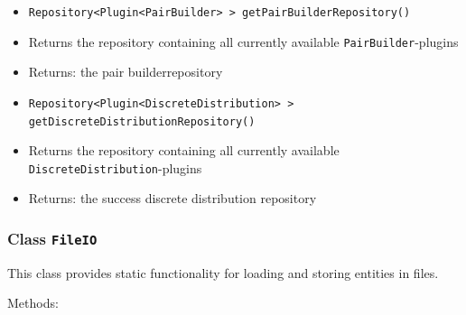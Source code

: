 \documentclass[parskip=full,11pt]{scrartcl}
\begin{document}
\begin{itemize}
	\item\texttt{Repository<Plugin<PairBuilder>\,> getPairBuilderRepository()}
	\item[]Returns the repository containing all currently available \texttt{PairBuilder}-plugins
	\item[] Returns: the pair builderrepository
	\item\texttt{Repository<Plugin<DiscreteDistribution>\,> getDiscreteDistributionRepository()}
	\item[]Returns the repository containing all currently available \texttt{DiscreteDistribution}-plugins
	\item[] Returns: the success discrete distribution repository
\end{itemize}

\subsubsection{Class \texttt{FileIO}}

This class provides static functionality for loading and storing entities in files.

Methods:
\end{document}

